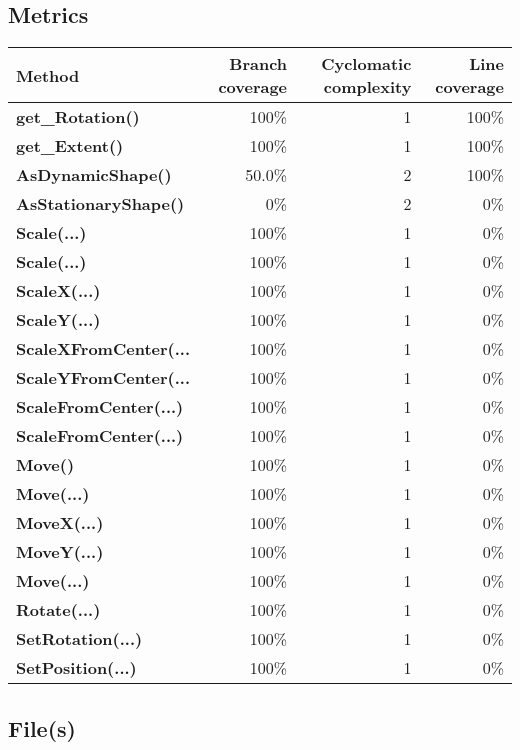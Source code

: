\documentclass[a4paper,landscape,10pt]{article}
\begin{document}
\subsection{Metrics}
\begin{longtable}[l]{|l|r|r|r|}
\hline
\textbf{Method} & \textbf{Branch coverage} & \textbf{Cyclomatic complexity} & \textbf{Line coverage}\\
\hline
\textbf{get\_Rotation()} & 100\% & 1 & 100\%\\
\hline
\textbf{get\_Extent()} & 100\% & 1 & 100\%\\
\hline
\textbf{AsDynamicShape()} & 50.0\% & 2 & 100\%\\
\hline
\textbf{AsStationaryShape()} & 0\% & 2 & 0\%\\
\hline
\textbf{Scale(...)} & 100\% & 1 & 0\%\\
\hline
\textbf{Scale(...)} & 100\% & 1 & 0\%\\
\hline
\textbf{ScaleX(...)} & 100\% & 1 & 0\%\\
\hline
\textbf{ScaleY(...)} & 100\% & 1 & 0\%\\
\hline
\textbf{ScaleXFromCenter(...} & 100\% & 1 & 0\%\\
\hline
\textbf{ScaleYFromCenter(...} & 100\% & 1 & 0\%\\
\hline
\textbf{ScaleFromCenter(...)} & 100\% & 1 & 0\%\\
\hline
\textbf{ScaleFromCenter(...)} & 100\% & 1 & 0\%\\
\hline
\textbf{Move()} & 100\% & 1 & 0\%\\
\hline
\textbf{Move(...)} & 100\% & 1 & 0\%\\
\hline
\textbf{MoveX(...)} & 100\% & 1 & 0\%\\
\hline
\textbf{MoveY(...)} & 100\% & 1 & 0\%\\
\hline
\textbf{Move(...)} & 100\% & 1 & 0\%\\
\hline
\textbf{Rotate(...)} & 100\% & 1 & 0\%\\
\hline
\textbf{SetRotation(...)} & 100\% & 1 & 0\%\\
\hline
\textbf{SetPosition(...)} & 100\% & 1 & 0\%\\
\hline
\end{longtable}
\subsection{File(s)}
\end{document}
